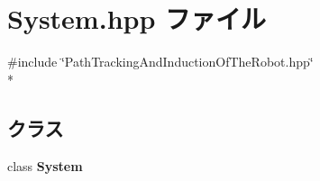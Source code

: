 \section{System.\-hpp ファイル}
\label{_system_8hpp}
{\ttfamily \#include \char`\"{}Path\-Tracking\-And\-Induction\-Of\-The\-Robot.\-hpp\char`\"{}}\\*
\subsection*{クラス}
\begin{DoxyCompactItemize}
\item 
class {\bf System}
\end{DoxyCompactItemize}
